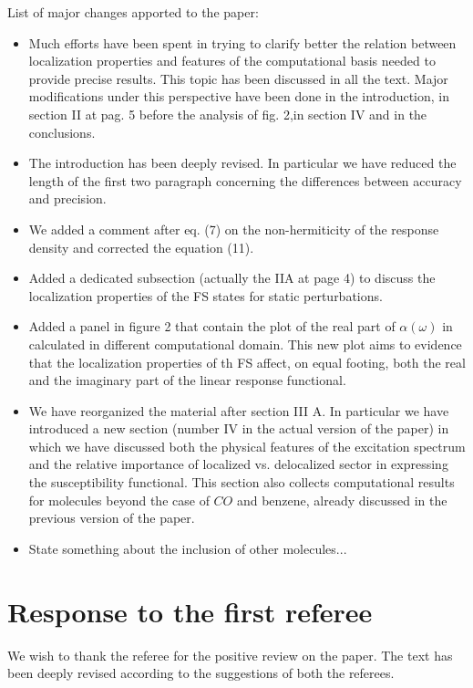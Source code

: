 \documentclass[11pt,a4paper]{article}
\begin{document}

List of major changes apported to the paper:
\begin{itemize}
 \item Much efforts have been spent in trying to clarify better the relation between localization properties and features of the computational basis needed 
 to provide precise results. This topic has been discussed in all the text. Major modifications under this perspective have been done in the introduction, in section II at pag. 5 before the analysis of fig. 2,in section IV and in the conclusions. 
 \item The introduction has been deeply revised. In particular we have reduced the length of the first two paragraph concerning the differences between accuracy and precision.
 \item We added a comment after eq. (7) on the non-hermiticity of the response density and corrected the equation (11).
 \item Added a dedicated subsection (actually the IIA at page 4)  to discuss the localization properties of the FS states for static perturbations. 
 \item Added a panel in figure 2 that contain the plot of the real part of $\alpha(\omega)$ in calculated in different computational domain. This new plot aims to evidence that the localization
 properties of th FS affect, on equal footing, both the real and the imaginary part of the linear response functional.
 \item We have reorganized the material after section III A. In particular we have introduced a new section (number IV in the actual version of the paper) in which we have discussed both the physical features of the excitation spectrum and the relative importance of localized vs. delocalized sector in expressing the susceptibility functional. This section also collects computational results for molecules beyond the case of $CO$ and benzene, already discussed in the previous version of the paper.  
 \item State something about the inclusion of other molecules...
\end{itemize}

\section*{Response to the first referee}

We wish to thank the referee for the positive review on the paper. The text has been deeply revised according to the suggestions of both the referees.
\end{document}
